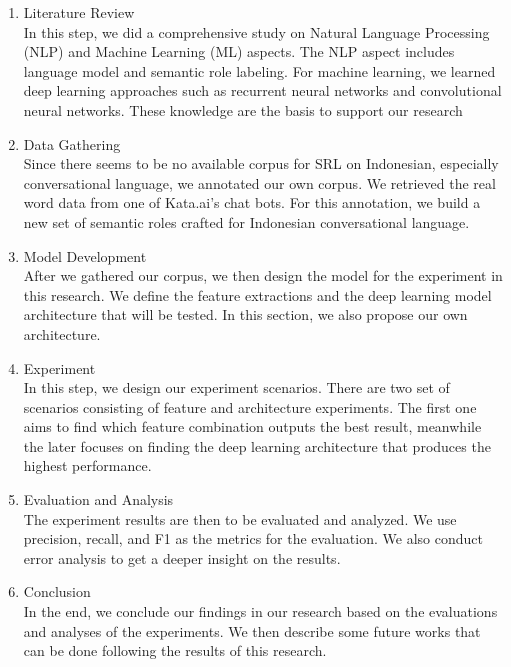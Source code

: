 \begin{enumerate}
	\item Literature Review\\
	In this step, we did a comprehensive study on Natural Language Processing (NLP) and Machine Learning (ML) aspects. The NLP aspect includes language model and semantic role labeling. For machine learning, we learned deep learning approaches such as recurrent neural networks and convolutional neural networks. These knowledge are the basis to support our research
	
	\item Data Gathering\\
	Since there seems to be no available corpus for SRL on Indonesian, especially conversational language, we annotated our own corpus. We retrieved the real word data from one of Kata.ai's chat bots. For this annotation, we build a new set of semantic roles crafted for Indonesian conversational language.
	
	\item Model Development\\
	After we gathered our corpus, we then design the model for the experiment in this research. We define the feature extractions and the deep learning model architecture that will be tested. In this section, we also propose our own architecture.
		
	\item Experiment \\
	In this step, we design our experiment scenarios. There are two set of scenarios consisting of feature and architecture experiments. The first one aims to find which feature combination outputs the best result, meanwhile the later focuses on finding the deep learning architecture that produces the highest performance.
	
	\item Evaluation and Analysis \\
	The experiment results are then to be evaluated and analyzed. We use precision, recall, and F1 as the metrics for the evaluation. We also conduct error analysis to get a deeper insight on the results.
	
	\item Conclusion \\
	In the end, we conclude our findings in our research based on the evaluations and analyses of the experiments. We then describe some future works that can be done following the results of this research.
\end{enumerate}

